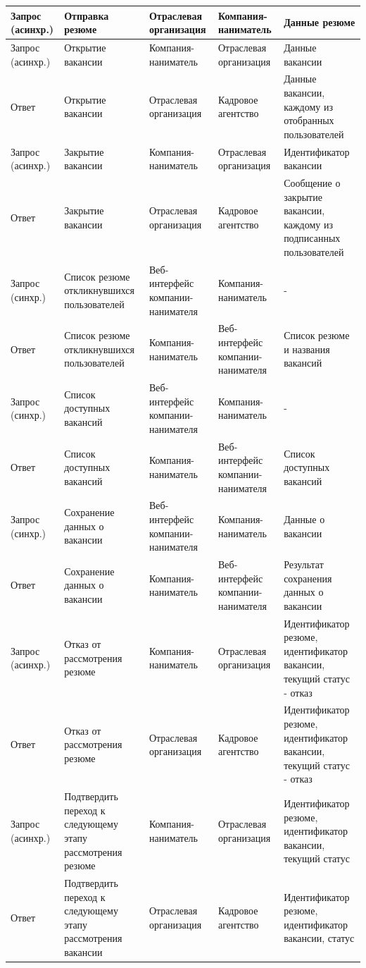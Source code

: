 \begin{longtable}[ht]{|p{}|p{3cm}|p{3cm}|p{3cm}|p{}|}
\hline
Запрос (асинхр.)	& Отправка резюме	& Отраслевая организация	& Компания- наниматель	& Данные резюме\\
\hline
Запрос (асинхр.)	& Открытие вакансии & Компания- наниматель & Отраслевая организация	& Данные вакансии\\
\hline
Ответ	& Открытие вакансии & Отраслевая организация & Кадровое агентство	& Данные вакансии, каждому из отобранных пользователей\\
\hline
Запрос (асинхр.)	& Закрытие вакансии & Компания- наниматель & Отраслевая организация	& Идентификатор вакансии\\
\hline
Ответ	& Закрытие вакансии & Отраслевая организация & Кадровое агентство	& Сообщение о закрытие вакансии, каждому из подписанных пользователей\\
\hline
Запрос (синхр.)	& Список резюме откликнувшихся пользователей	& Веб-интерфейс компании-нанимателя 	& Компания-наниматель	& -\\
\hline
Ответ	& Список резюме откликнувшихся пользователей	& Компания-наниматель & Веб-интерфейс компании-нанимателя	& Список резюме и названия вакансий\\
\hline
Запрос (синхр.)	& Список доступных вакансий	& Веб-интерфейс компании-нанимателя 	& Компания-наниматель	& -\\
\hline
Ответ	& Список доступных вакансий	& Компания-наниматель & Веб-интерфейс компании-нанимателя	&  Список доступных вакансий\\
\hline
Запрос (синхр.)	& Сохранение данных о вакансии & Веб-интерфейс компании-нанимателя 	& Компания-наниматель	& Данные о вакансии \\
\hline
Ответ	& Сохранение данных о вакансии	& Компания-наниматель & Веб-интерфейс компании-нанимателя	& Результат сохранения данных о вакансии \\
\hline
Запрос (асинхр.)	& Отказ от рассмотрения резюме & Компания-наниматель & Отраслевая организация	& Идентификатор резюме, идентификатор вакансии, текущий статус - отказ\\
\hline
Ответ	& Отказ от рассмотрения резюме  & Отраслевая организация & Кадровое агентство & Идентификатор резюме, идентификатор вакансии, текущий статус - отказ\\
\hline
Запрос (асинхр.)	& Подтвердить переход к следующему этапу рассмотрения резюме & Компания- наниматель & Отраслевая организация	& Идентификатор резюме, идентификатор вакансии, текущий статус\\
\hline
Ответ	& Подтвердить переход к следующему этапу рассмотрения вакансии  & Отраслевая организация & Кадровое агентство & Идентификатор резюме, идентификатор вакансии, статус\\
\hline

\end{longtable}





























